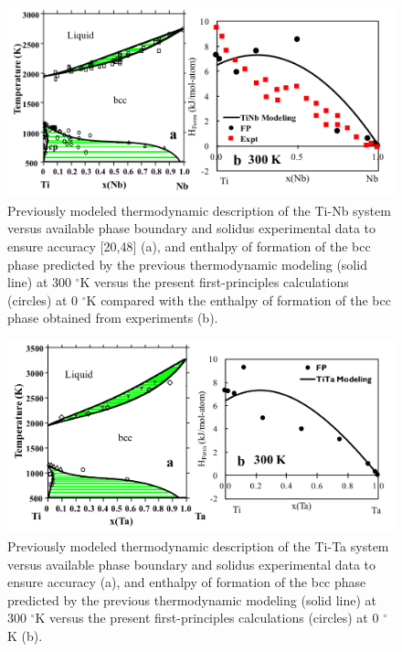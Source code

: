\newpage
\begin{figure}[H]
	\centering
	\includegraphics[width=\textwidth]{Chapter-3/Figures/TiNb.png}
	\caption{Previously modeled thermodynamic description of the Ti-Nb system versus available phase boundary and solidus experimental data to ensure accuracy \cite{Zhang2001,Kumar1994,Kumar1994a}[20,48] (a), and enthalpy of formation of the bcc phase predicted by the previous thermodynamic modeling (solid line) at 300 $^{\circ}$K versus the present first-principles calculations (circles) at 0 $^{\circ}$K compared with the enthalpy of formation of the bcc phase obtained from experiments \cite{Uesugi2013} (b).}
	\label{Ch3-figure:TiNb}
\end{figure}

\newpage
\begin{figure}[H]
	\centering
	\includegraphics[width=\textwidth]{Chapter-3/Figures/TiTa.png}
	\caption{Previously modeled thermodynamic description of the Ti-Ta system versus available phase boundary and solidus experimental data to ensure accuracy \cite{Murray1987,Ansara1998} (a), and enthalpy of formation of the bcc phase predicted by the previous thermodynamic modeling (solid line) at 300 $^{\circ}$K versus the present first-principles calculations (circles) at 0 $^{\circ}$K (b).}
	\label{Ch3-figure:TiTa}
\end{figure}

